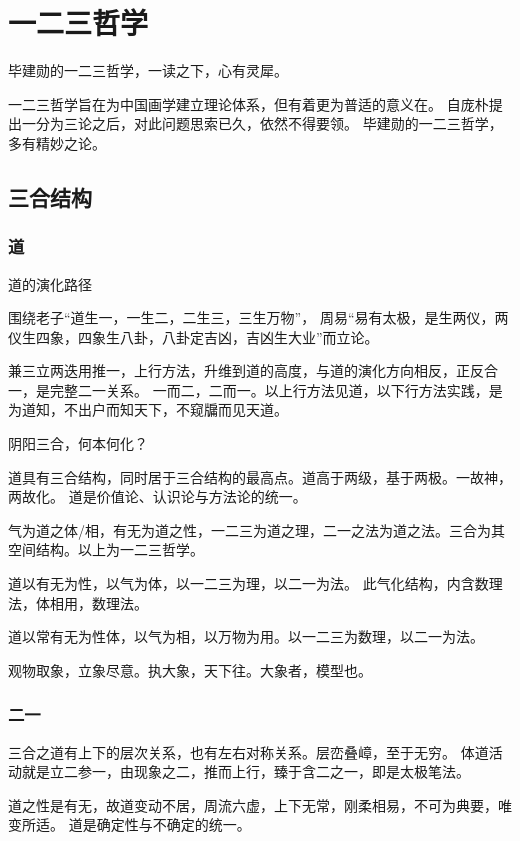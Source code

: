 \chapter{一二三哲学}

毕建勋的一二三哲学，一读之下，心有灵犀。

一二三哲学旨在为中国画学建立理论体系，但有着更为普适的意义在。
自庞朴提出一分为三论之后，对此问题思索已久，依然不得要领。
毕建勋的一二三哲学，多有精妙之论。

\section{三合结构}

\subsection{道}

道的演化路径

围绕老子“道生一，一生二，二生三，三生万物”，
周易“易有太极，是生两仪，两仪生四象，四象生八卦，八卦定吉凶，吉凶生大业”而立论。

兼三立两迭用推一，上行方法，升维到道的高度，与道的演化方向相反，正反合一，是完整二一关系。
一而二，二而一。以上行方法见道，以下行方法实践，是为道知，不出户而知天下，不窥牖而见天道。

阴阳三合，何本何化？

道具有三合结构，同时居于三合结构的最高点。道高于两级，基于两极。一故神，两故化。
道是价值论、认识论与方法论的统一。

气为道之体/相，有无为道之性，一二三为道之理，二一之法为道之法。三合为其空间结构。以上为一二三哲学。

道以有无为性，以气为体，以一二三为理，以二一为法。
此气化结构，内含数理法，体相用，数理法。

道以常有无为性体，以气为相，以万物为用。以一二三为数理，以二一为法。

观物取象，立象尽意。执大象，天下往。大象者，模型也。

\subsection{二一}

三合之道有上下的层次关系，也有左右对称关系。层峦叠嶂，至于无穷。
体道活动就是立二参一，由现象之二，推而上行，臻于含二之一，即是太极笔法。

道之性是有无，故道变动不居，周流六虚，上下无常，刚柔相易，不可为典要，唯变所适。
道是确定性与不确定的统一。

